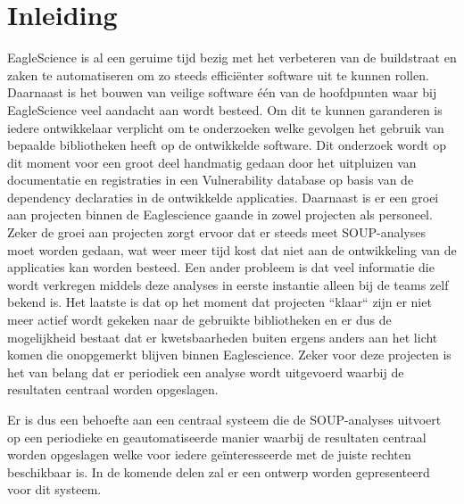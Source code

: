 \chapter{Inleiding}\label{ch:impl-inleiding}
EagleScience is al een geruime tijd bezig met het verbeteren van de buildstraat en zaken te automatiseren om zo steeds efficiënter software uit te kunnen rollen. Daarnaast is het bouwen van veilige software één van de hoofdpunten waar bij EagleScience veel aandacht aan wordt besteed. Om dit te kunnen garanderen is iedere ontwikkelaar verplicht om te onderzoeken welke gevolgen het gebruik van bepaalde bibliotheken heeft op de ontwikkelde software. Dit onderzoek wordt op dit moment voor een groot deel handmatig gedaan door het uitpluizen van documentatie en registraties in een Vulnerability database op basis van de dependency declaraties in de ontwikkelde applicaties. Daarnaast is er een groei aan projecten binnen de Eaglescience gaande in zowel projecten als personeel. Zeker de groei aan projecten zorgt ervoor dat er steeds meet SOUP-analyses moet worden gedaan, wat weer meer tijd kost dat niet aan de ontwikkeling van de applicaties kan worden besteed. Een ander probleem is dat veel informatie die wordt verkregen middels deze analyses in eerste instantie alleen bij de teams zelf bekend is. Het laatste is dat op het moment dat projecten ``klaar`` zijn er niet meer actief wordt gekeken naar de gebruikte bibliotheken en er dus de mogelijkheid bestaat dat er kwetsbaarheden buiten ergens anders aan het licht komen die onopgemerkt blijven binnen Eaglescience. Zeker voor deze projecten is het van belang dat er periodiek een analyse wordt uitgevoerd waarbij de resultaten centraal worden opgeslagen.

Er is dus een behoefte aan een centraal systeem die de SOUP-analyses uitvoert op een periodieke en geautomatiseerde manier waarbij de resultaten centraal worden opgeslagen welke voor iedere geïnteresseerde met de juiste rechten beschikbaar is. In de komende delen zal er een ontwerp worden gepresenteerd voor dit systeem.
